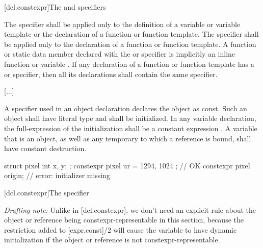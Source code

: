 \documentclass{wg21}
\begin{document}
[dcl.constexpr]{The  and  specifiers}%


\pnum
The  specifier shall be applied only to
the definition of a variable or variable template or
the declaration of a function or function template.
The  specifier shall be applied only to
the declaration of a function or function template.
A function or static data member
declared with the  or  specifier
is implicitly an inline function or variable .
If any declaration of a function or function template has
a  or  specifier,
then all its declarations shall contain the same specifier.

[...]


\pnum
A  specifier used in an object declaration
declares the object as const.
Such an object
shall have literal type and
shall be initialized.
In any  variable declaration,
the full-expression of the initialization
shall be a constant expression .
A  variable that is an object,
as well as any temporary to which a  reference is bound,
shall have constant destruction.


\begin{example}
    \begin{codeblock}
        struct pixel {
            int x, y;
        };
        constexpr pixel ur = { 1294, 1024 };    // OK
        constexpr pixel origin;                 // error: initializer missing
    \end{codeblock}
\end{example}

[dcl.constexpr]{The  specifier}

\emph{Drafting note:} Unlike in [dcl.constexpr], we don't need an explicit rule
about the object or reference being constexpr-representable in this section,
because the restriction added to [expr.const]/2 will cause the variable to have
dynamic initialization if the object or reference is not
constexpr-representable.
\end{document}
